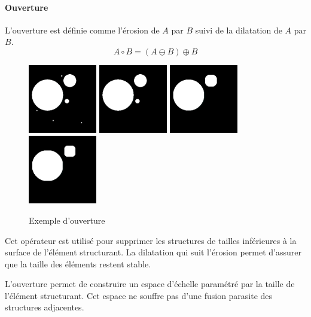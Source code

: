 \paragraph{Ouverture}
L'ouverture est définie comme l'érosion de $A$ par $B$ suivi de la dilatation de $A$ par $B$.
\begin{equation}
 A \circ B = (A \ominus B) \oplus B
\end{equation}

\begin{figure}
  \centering
  \includegraphics[height=3cm]{Images/morpho_init.png}
  \includegraphics[height=3cm]{Images/morpho_open_k5.png}
  \includegraphics[height=3cm]{Images/morpho_open_k21.png}
  \includegraphics[height=3cm]{Images/morpho_open_k31.png}
  \label{fig:morpho_ouverture}
  \caption{Exemple d'ouverture}
\end{figure}

Cet opérateur est utilisé pour supprimer les structures de tailles inférieures à la surface de l'élément structurant. La dilatation qui suit l'érosion permet d'assurer que la taille des éléments restent stable.

L'ouverture permet de construire un espace d'échelle paramétré par la taille de l'élément structurant. Cet espace ne souffre pas d'une fusion parasite des structures adjacentes.

